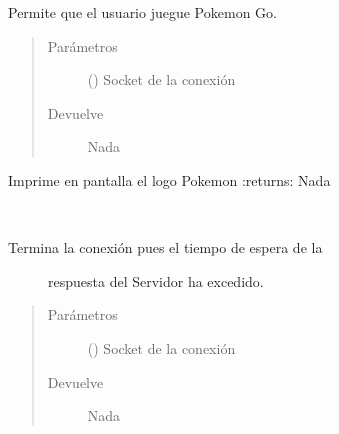 \documentclass[letterpaper,10pt,spanish,openany,oneside]{sphinxmanual}
\begin{document}

\begin{fulllineitems}
\label{\detokenize{pokemonClient:pokemonClient.playPokemon}}
Permite que el usuario juegue Pokemon Go.
\begin{quote}\begin{description}
\item[{Parámetros}] \leavevmode
{} () \textendash{} Socket de la conexión

\item[{Devuelve}] \leavevmode
Nada

\end{description}\end{quote}

\end{fulllineitems}


\begin{fulllineitems}
\label{\detokenize{pokemonClient:pokemonClient.printPokemon}}
Imprime en pantalla el logo Pokemon
:returns: Nada

\end{fulllineitems}


\begin{fulllineitems}
\label{\detokenize{pokemonClient:pokemonClient.terminarConTimeout}}~\begin{description}
\item[{Termina la conexión pues el tiempo de espera de la}] \leavevmode
respuesta del Servidor ha excedido.

\end{description}
\begin{quote}\begin{description}
\item[{Parámetros}] \leavevmode
{} () \textendash{} Socket de la conexión

\item[{Devuelve}] \leavevmode
Nada

\end{description}\end{quote}

\end{fulllineitems}
\end{document}

